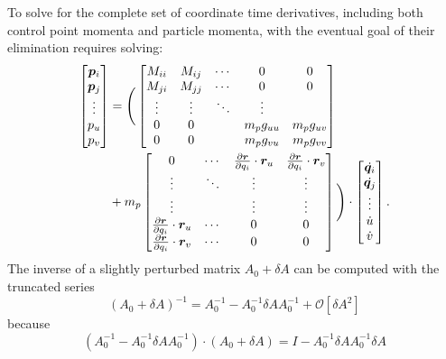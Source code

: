 To solve for the complete set of coordinate time derivatives, including both control point momenta and particle momenta, with the eventual goal of their elimination requires solving:
\begin{align}
\begin{bmatrix}
\boldsymbol{p}_i \\
\boldsymbol{p}_j \\
\vdots    \\
p_u \\
p_v
\end{bmatrix}
&=
\Bigg(
\begin{bmatrix}
M_{ii} & M_{ij} & \cdots & 0 & 0\\
M_{ji} & M_{jj} & \cdots & 0 & 0\\
\vdots & \vdots & \ddots & \vdots \\
0 & 0 & & m_p g_{uu} & m_p g_{uv} \\
0 & 0 & & m_p g_{vu} & m_p g_{vv}
\end{bmatrix}
\nonumber \\
&+ m_p 
\begin{bmatrix}
0 & \cdots & \frac{\partial \boldsymbol{r}}{\partial q_i} \cdot \boldsymbol{r}_u & \frac{\partial \boldsymbol{r}}{\partial q_i} \cdot \boldsymbol{r}_v \\
\vdots & \ddots & \vdots & \vdots \\
\vdots &        & \vdots & \vdots \\
\frac{\partial \boldsymbol{r}}{\partial q_i} \cdot \boldsymbol{r}_u  & \cdots & 0 & 0 \\
\frac{\partial \boldsymbol{r}}{\partial q_i} \cdot \boldsymbol{r}_v  & \cdots & 0 & 0 
\end{bmatrix}
\Bigg)
\cdot 
\begin{bmatrix}
\dot{\boldsymbol{q}_i} \\
\dot{\boldsymbol{q}_j} \\
\vdots    \\
\dot{u} \\
\dot{v}
\end{bmatrix}.
\end{align}
The inverse of a slightly perturbed matrix $A_0 + \delta A$ can be computed with the truncated series
\begin{equation}
(A_0+\delta A)^{-1} = A_0^{-1} - A_0^{-1} \delta A A_0^{-1} + \mathcal{O}[\delta A^2]
\end{equation}
because
\begin{equation}
(A_0^{-1} - A_0^{-1} \delta A A_0^{-1}) \cdot (A_0 + \delta A) = I - A_0^{-1} \delta A A_0^{-1} \delta A
\end{equation}

